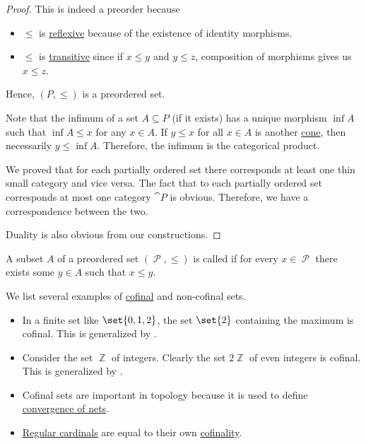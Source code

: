 \begin{proof}
  This is indeed a preorder because
  \begin{itemize}
    \item \( \leq \) is \hyperref[def:binary_relation/reflexive]{reflexive} because of the existence of identity morphisms.
    \item \( \leq \) is \hyperref[def:binary_relation/transitive]{transitive} since if \( x \leq y \) and \( y \leq z \), composition of morphisms gives us \( x \leq z \).
  \end{itemize}

  Hence, \( (P, \leq) \) is a preordered set.

  Note that the infimum of a set \( A \subseteq P \) (if it exists) has a unique morphism \( \inf A \) such that \( \inf A \leq x \) for any \( x \in A \). If \( y \leq x \) for all \( x \in A \) is another \hyperref[def:categorical_cone]{cone}, then necessarily \( y \leq \inf A \). Therefore, the infimum is the categorical product.

  We proved that for each partially ordered set there corresponds at least one thin small category and vice versa. The fact that to each partially ordered set corresponds at most one category \( \cat{P} \) is obvious. Therefore, we have a correspondence between the two.

  Duality is also obvious from our constructions.
\end{proof}

\begin{definition}\label{def:cofinal_set}
  A subset \( A \) of a preordered set \( (\mscrP, \leq) \) is called  if for every \( x \in \mscrP \) there exists some \( y \in A \) such that \( x \leq y \).
\end{definition}

\begin{example}\label{ex:def:cofinal_set}
  We list several examples of \hyperref[def:cofinal_set]{cofinal} and non-cofinal sets.

  \begin{itemize}
    \item In a finite set like \( \set{ 0, 1, 2 } \), the set \( \set{ 2 } \) containing the maximum is cofinal. This is generalized by .

    \item Consider the set \( \BbbZ \) of integers. Clearly the set \( 2\BbbZ \) of even integers is cofinal. This is generalized by .

    \item Cofinal sets are important in topology because it is used to define \hyperref[def:net_convergence]{convergence of nets}.

    \item \hyperref[def:regular_cardinal]{Regular cardinals} are equal to their own \hyperref[def:cofinality]{cofinality}.
  \end{itemize}
\end{example}
